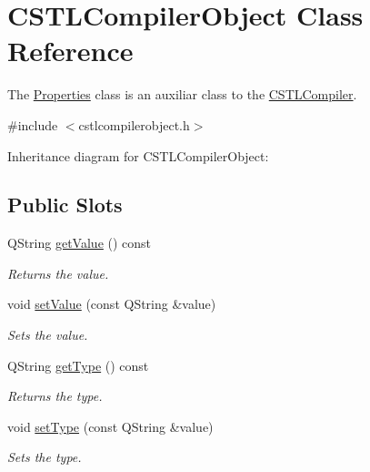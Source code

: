 \hypertarget{class_c_s_t_l_compiler_object}{}\section{C\+S\+T\+L\+Compiler\+Object Class Reference}
\label{class_c_s_t_l_compiler_object}


The \hyperlink{class_properties}{Properties} class is an auxiliar class to the \hyperlink{class_c_s_t_l_compiler}{C\+S\+T\+L\+Compiler}.  




{\ttfamily \#include $<$cstlcompilerobject.\+h$>$}



Inheritance diagram for C\+S\+T\+L\+Compiler\+Object\+:
\subsection*{Public Slots}
\begin{DoxyCompactItemize}
\item 
Q\+String \hyperlink{class_c_s_t_l_compiler_object_a3ee0eea5271717302cd4cb34720b656e}{get\+Value} () const
\begin{DoxyCompactList}\small\item\em Returns the value. \end{DoxyCompactList}\item 
void \hyperlink{class_c_s_t_l_compiler_object_ab32dd59c381d9fbf7d2ce58226c4f93a}{set\+Value} (const Q\+String \&value)
\begin{DoxyCompactList}\small\item\em Sets the value. \end{DoxyCompactList}\item 
Q\+String \hyperlink{class_c_s_t_l_compiler_object_a3e853137310474444650ad78e307b9a8}{get\+Type} () const
\begin{DoxyCompactList}\small\item\em Returns the type. \end{DoxyCompactList}\item 
void \hyperlink{class_c_s_t_l_compiler_object_a16ec55cd3515f6d72c79c565bcad9243}{set\+Type} (const Q\+String \&value)
\begin{DoxyCompactList}\small\item\em Sets the type. \end{DoxyCompactList}\end{DoxyCompactItemize}
